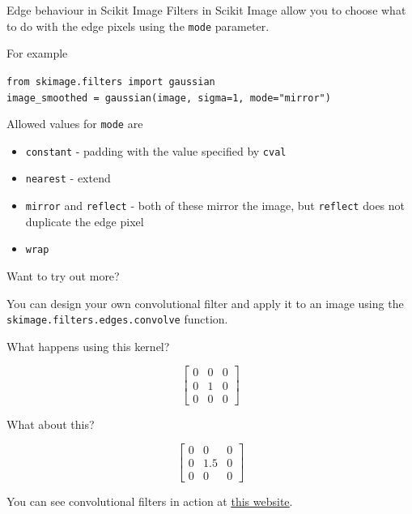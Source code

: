 \documentclass[9pt, aspectratio=169]{beamer}
\begin{document}
\begin{frame}
{
    }
\end{frame}

\begin{frame}
{Edge behaviour in Scikit Image}
Filters in Scikit Image allow you to choose what to do with the edge pixels using the \texttt{mode} parameter.

For example

\begin{codebox}
\texttt{from skimage.filters import gaussian\\
image\_smoothed = gaussian(image, sigma=1, mode="mirror")}
\end{codebox}

Allowed values for \texttt{mode} are

\begin{itemize}
\item \texttt{constant} - padding with the value specified by \texttt{cval}
\item \texttt{nearest} - extend
\item \texttt{mirror} and \texttt{reflect} - both of these mirror the image, but \texttt{reflect} does not duplicate the edge pixel
\item \texttt{wrap}
\end{itemize}

\end{frame}

\begin{frame}
{Want to try out more?}

You can design your own convolutional filter and apply it to an image using the \texttt{skimage.filters.edges.convolve} function.

What happens using this kernel?

$$\begin{bmatrix}0 & 0 & 0 \\ 0 & 1 & 0 \\ 0 & 0 & 0\end{bmatrix}$$

What about this?

$$\begin{bmatrix}0 & 0 & 0 \\ 0 & 1.5 & 0 \\ 0 & 0 & 0\end{bmatrix}$$

You can see convolutional filters in action at \href{https://setosa.io/ev/image-kernels/}{\underline{this website}}.
\end{frame}
\end{document}
